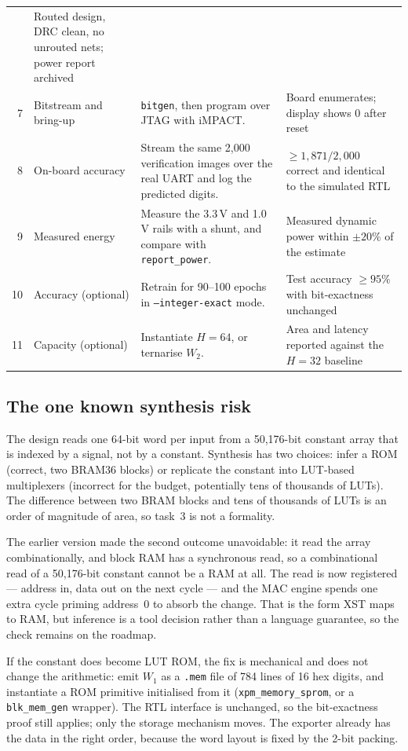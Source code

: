 \documentclass[11pt,a4paper]{article}
\begin{document}
\begin{table}[H]
\begin{tabularx}{\linewidth}{@{}r
  >{\raggedright\arraybackslash}p{3.2cm} L
  >{\raggedright\arraybackslash}p{4.0cm}@{}}
  & Routed design, DRC clean, no unrouted nets; power report archived \\
7 & Bitstream and bring-up & \texttt{bitgen}, then program over JTAG with
  iMPACT.
  & Board enumerates; display shows 0 after reset \\
8 & On-board accuracy & Stream the same 2{,}000 verification images over the
  real UART and log the predicted digits.
  & $\ge 1{,}871/2{,}000$ correct and identical to the simulated RTL \\
9 & Measured energy & Measure the 3.3\,V and 1.0\,V rails with a shunt, and
  compare with \texttt{report\_power}.
  & Measured dynamic power within $\pm20\%$ of the estimate \\
10 & Accuracy (optional) & Retrain for 90--100 epochs in
  \texttt{--integer-exact} mode.
  & Test accuracy $\ge 95\%$ with bit-exactness unchanged \\
11 & Capacity (optional) & Instantiate $H{=}64$, or ternarise $W_2$.
  & Area and latency reported against the $H{=}32$ baseline \\
\bottomrule
\end{tabularx}
\end{table}

\subsection{The one known synthesis risk}

The design reads one 64-bit word per input from a 50{,}176-bit constant array
that is indexed by a signal, not by a constant. Synthesis has two choices: infer
a ROM (correct, two BRAM36 blocks) or replicate the constant into LUT-based
multiplexers (incorrect for the budget, potentially tens of thousands of LUTs).
The difference between two BRAM blocks and tens of thousands of LUTs is an order
of magnitude of area, so task~3 is not a formality.

The earlier version made the second outcome unavoidable: it read the array
combinationally, and block RAM has a synchronous read, so a combinational read
of a 50{,}176-bit constant cannot be a RAM at all. The read is now registered ---
address in, data out on the next cycle --- and the MAC engine spends one extra
cycle priming address~0 to absorb the change. That is the form XST maps to RAM,
but inference is a tool decision rather than a language guarantee, so the check
remains on the roadmap.

If the constant does become LUT ROM, the fix is mechanical and does not change
the arithmetic: emit $W_1$ as a \texttt{.mem} file of 784 lines of 16 hex digits,
and instantiate a ROM primitive initialised from it
(\texttt{xpm\_memory\_sprom}, or a \texttt{blk\_mem\_gen} wrapper). The
RTL interface is unchanged, so the bit-exactness proof still applies; only the
storage mechanism moves. The exporter already has the data in the right order,
because the word layout is fixed by the 2-bit packing.
\end{document}
